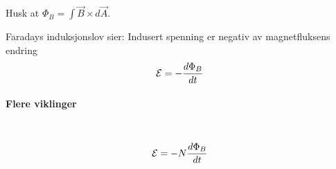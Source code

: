 Husk at $\Phi_B = \int\vec{B}\times d\vec{A}$.

Faradays induksjonslov sier:
Indusert spenning er negativ av magnetfluksens endring
$$\mathcal{E} = -\frac{d\Phi_B}{dt}$$



\paragraph{Flere viklinger} \hfill \\
$$\mathcal{E} = -N\frac{d\Phi_B}{dt}$$
